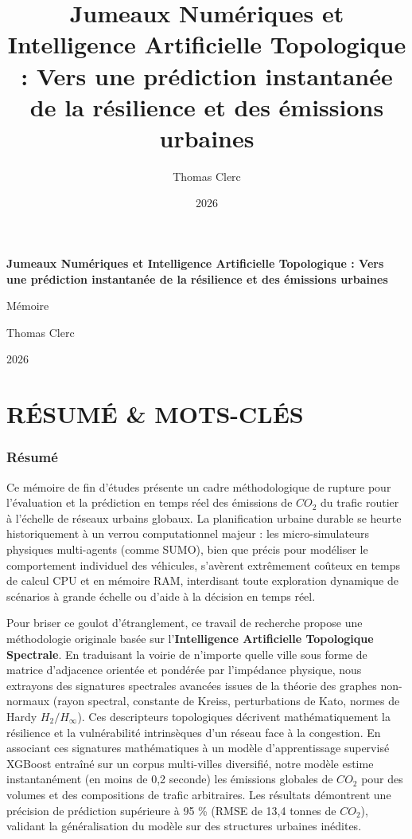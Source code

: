 \documentclass[10pt, a4paper]{article}
\title{Jumeaux Numériques et Intelligence Artificielle Topologique :
Vers une prédiction instantanée de la résilience et des émissions
urbaines}
\author{Thomas Clerc}
\date{2026}
\begin{document}
\begin{titlepage}
\centering
\vspace*{2cm}
{\Huge\bfseries Jumeaux Numériques et Intelligence Artificielle
Topologique : Vers une prédiction instantanée de la résilience et des
émissions urbaines\par}
\vspace{1.5cm}
{\Large Mémoire\par}
\vspace{1cm}
{\large Thomas Clerc\par}
\vspace{0.5cm}
{\large 2026\par}
\vfill
\end{titlepage}

\tableofcontents
\newpage

\section{RÉSUMÉ \& MOTS-CLÉS}\label{ruxe9sumuxe9-mots-cluxe9s}

\subsubsection{Résumé}\label{ruxe9sumuxe9}

Ce mémoire de fin d'études présente un cadre méthodologique de rupture
pour l'évaluation et la prédiction en temps réel des émissions de
\(CO_2\) du trafic routier à l'échelle de réseaux urbains globaux. La
planification urbaine durable se heurte historiquement à un verrou
computationnel majeur : les micro-simulateurs physiques multi-agents
(comme SUMO), bien que précis pour modéliser le comportement individuel
des véhicules, s'avèrent extrêmement coûteux en temps de calcul CPU et
en mémoire RAM, interdisant toute exploration dynamique de scénarios à
grande échelle ou d'aide à la décision en temps réel.

Pour briser ce goulot d'étranglement, ce travail de recherche propose
une méthodologie originale basée sur l'\textbf{Intelligence Artificielle
Topologique Spectrale}. En traduisant la voirie de n'importe quelle
ville sous forme de matrice d'adjacence orientée et pondérée par
l'impédance physique, nous extrayons des signatures spectrales avancées
issues de la théorie des graphes non-normaux (rayon spectral, constante
de Kreiss, perturbations de Kato, normes de Hardy \(H_2/H_\infty\)). Ces
descripteurs topologiques décrivent mathématiquement la résilience et la
vulnérabilité intrinsèques d'un réseau face à la congestion. En
associant ces signatures mathématiques à un modèle d'apprentissage
supervisé XGBoost entraîné sur un corpus multi-villes diversifié, notre
modèle estime instantanément (en moins de 0,2 seconde) les émissions
globales de \(CO_2\) pour des volumes et des compositions de trafic
arbitraires. Les résultats démontrent une précision de prédiction
supérieure à 95 \% (RMSE de 13,4 tonnes de \(CO_2\)), validant la
généralisation du modèle sur des structures urbaines inédites.
\end{document}
